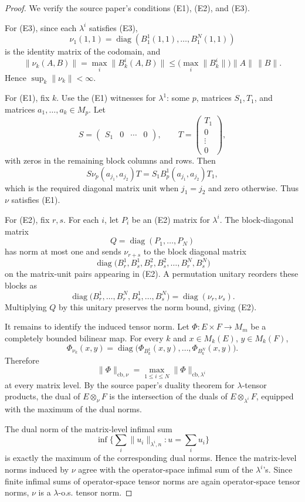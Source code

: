 \documentclass[11pt]{article}
\newcommand{\cb}{\mathrm{cb}}
\newcommand{\diag}{\operatorname{diag}}
\begin{document}
\begin{proof}
We verify the source paper's conditions (E1), (E2), and (E3).

For (E3), since each \(\lambda^i\) satisfies (E3),
\[
  \nu_1(1,1)=\diag(B^1_1(1,1),\ldots,B^N_1(1,1))
\]
is the identity matrix of the codomain, and
\[
  \|\nu_k(A,B)\|=\max_i\|B^i_k(A,B)\|
  \le \Big(\max_i\|B^i_k\|\Big)\|A\|\,\|B\|.
\]
Hence \(\sup_k\|\nu_k\|<\infty\).

For (E1), fix \(k\).  Use the (E1) witnesses for \(\lambda^1\): some \(p\),
matrices \(S_1,T_1\), and matrices \(a_1,\ldots,a_k\in M_p\).  Let
\[
  S=\begin{pmatrix}S_1&0&\cdots&0\end{pmatrix},\qquad
  T=\begin{pmatrix}T_1\\0\\\vdots\\0\end{pmatrix},
\]
with zeros in the remaining block columns and rows.  Then
\[
  S\nu_p(a_{j_1},a_{j_2})T
  =
  S_1B^1_p(a_{j_1},a_{j_2})T_1,
\]
which is the required diagonal matrix unit when \(j_1=j_2\) and zero
otherwise.  Thus \(\nu\) satisfies (E1).

For (E2), fix \(r,s\).  For each \(i\), let \(P_i\) be an (E2) matrix for
\(\lambda^i\).  The block-diagonal matrix
\[
  Q=\diag(P_1,\ldots,P_N)
\]
has norm at most one and sends \(\nu_{r+s}\) to the block diagonal matrix
\[
  \diag
  \big(B^1_r,B^1_s,B^2_r,B^2_s,\ldots,B^N_r,B^N_s\big)
\]
on the matrix-unit pairs appearing in (E2).  A permutation unitary reorders
these blocks as
\[
  \diag
  \big(B^1_r,\ldots,B^N_r,B^1_s,\ldots,B^N_s\big)
  =
  \diag(\nu_r,\nu_s).
\]
Multiplying \(Q\) by this unitary preserves the norm bound, giving (E2).

It remains to identify the induced tensor norm.  Let
\(\Phi:E\times F\to M_m\) be a completely bounded bilinear map.  For every
\(k\) and \(x\in M_k(E)\), \(y\in M_k(F)\),
\[
  \Phi_{\nu_k}(x,y)
  =
  \diag
  \big(\Phi_{B^1_k}(x,y),\ldots,\Phi_{B^N_k}(x,y)\big).
\]
Therefore
\[
  \|\Phi\|_{\cb,\nu}
  =
  \max_{1\le i\le N}\|\Phi\|_{\cb,\lambda^i}
\]
at every matrix level.  By the source paper's duality theorem for
\(\lambda\)-tensor products, the dual of \(E\otimes_\nu F\) is the intersection
of the duals of \(E\otimes_{\lambda^i}F\), equipped with the maximum of the
dual norms.

The dual norm of the matrix-level infimal sum
\[
  \inf\Big\{
      \sum_i\|u_i\|_{\lambda^i,n}: u=\sum_i u_i
  \Big\}
\]
is exactly the maximum of the corresponding dual norms.  Hence the
matrix-level norms induced by \(\nu\) agree with the operator-space infimal
sum of the \(\lambda^i\)'s.  Since finite infimal sums of operator-space tensor
norms are again operator-space tensor norms, \(\nu\) is a
\(\lambda\)-o.s. tensor norm.
\end{proof}
\end{document}
